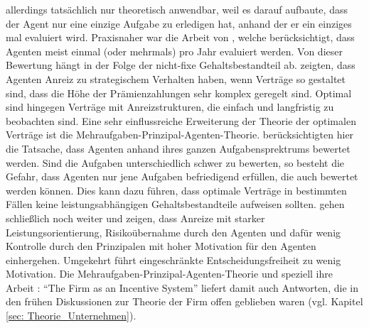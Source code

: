 allerdings tatsächlich nur theoretisch anwendbar, weil es darauf aufbaute, dass der Agent nur eine einzige Aufgabe zu erledigen hat, anhand der er ein einziges mal evaluiert wird. Praxisnaher war die Arbeit von \textcite{Holmstrom1987}, welche berücksichtigt, dass Agenten meist einmal (oder mehrmals) pro Jahr evaluiert werden. Von dieser Bewertung hängt in der Folge der nicht-fixe Gehaltsbestandteil ab. \textcite{Holmstrom1979} zeigten, dass Agenten Anreiz zu strategischem Verhalten haben, wenn Verträge so gestaltet sind, dass die Höhe der Prämienzahlungen sehr komplex geregelt sind. Optimal sind hingegen Verträge mit Anreizstrukturen, die einfach und langfristig zu beobachten sind.
Eine sehr einflussreiche Erweiterung der Theorie der optimalen Verträge ist die Mehraufgaben-Prinzipal-Agenten-Theorie. \textcite{Holmstrom1991} berücksichtigten hier die Tatsache, dass Agenten anhand ihres ganzen Aufgabensprektrums bewertet werden. Sind die Aufgaben unterschiedlich schwer zu bewerten, so besteht die Gefahr, dass Agenten nur jene Aufgaben befriedigend erfüllen, die auch bewertet werden können. Dies kann dazu führen, dass optimale Verträge in bestimmten Fällen keine leistungsabhängigen Gehaltsbestandteile aufweisen sollten. \textcite{Holmstrom1994} gehen schließlich noch weiter und zeigen, dass Anreize mit starker Leistungsorientierung, Risikoübernahme durch den Agenten und dafür wenig Kontrolle durch den Prinzipalen mit hoher Motivation für den Agenten einhergehen. Umgekehrt führt eingeschränkte Entscheidungsfreiheit zu wenig Motivation. Die Mehraufgaben-Prinzipal-Agenten-Theorie und speziell ihre Arbeit \textcite{Holmstrom1994}: "`The Firm as an Incentive System"' liefert damit auch Antworten, die in den frühen Diskussionen zur Theorie der Firm offen geblieben waren (vgl. Kapitel \ref{sec: Theorie_Unternehmen}).

